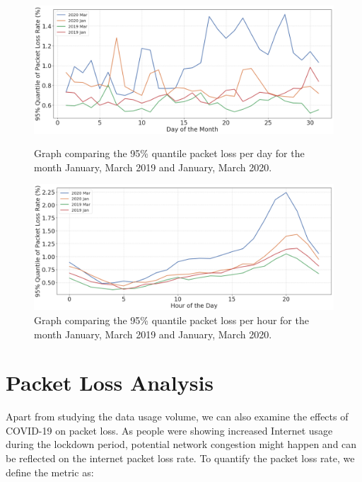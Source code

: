 \begin{figure}[t]
  \begin{minipage}[t]{0.496\linewidth}
    \centering 
    \includegraphics[width=0.98\linewidth]{figs/packet_loss_per_day.png} 
    \caption{Graph comparing the 95\% quantile packet loss per day for the month January, March 2019 and January, March 2020.} 
    \label{fig:packetlossperday} 
  \end{minipage}
  \begin{minipage}[t]{0.496\linewidth} 
    \centering 
    \includegraphics[width=0.98\linewidth]{figs/packet_loss_per_hour.png} 
    \caption{Graph comparing the 95\% quantile packet loss per hour for the month January, March 2019 and January, March 2020.} 
    \label{fig:packetlossperhour} 
  \end{minipage} 
\end{figure}

\section{Packet Loss Analysis}
Apart from studying the data usage volume, we can also examine the effects of COVID-19 on  packet loss. As people were showing increased Internet usage during the lockdown period, potential network congestion might happen and can be reflected on the internet packet loss rate. To quantify the packet loss rate, we define the metric as:


